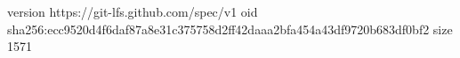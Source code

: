 version https://git-lfs.github.com/spec/v1
oid sha256:ecc9520d4f6daf87a8e31c375758d2ff42daaa2bfa454a43df9720b683df0bf2
size 1571
